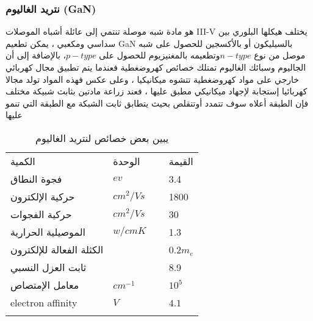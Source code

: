 \subsubsection{ نتريد الغاليوم (GaN)}
هو مادة شبه موصلة تنتمي إلى عائلة أشباه الموصلات III-V يختلف هيكلها البلوري بين سداسي ومكعبي   ، يمكن تطعيم GaN بالسيليكون أو بالأكسجين للحصول على شبه موصل من نوع $ n-type  $وتطعيمه بالمغنيزيوم للحصول على $ p-type  $، بالإضافة إلى أن الجاليوم وسبائك الغاليوم تمتلك خصائص كهروضغطية فعندما يتم تطبيق مجال كهربائي خارجي على مواد كهروضغطية تتشوه ميكانيكيا ، وعلى عكس فهذه المواد  تولد   مجالا كهربائيا إستجابة لإجهاد ميكانيكي مطبق عليها ، فعند زراعة مادتين بثابث شبيكة مختلف فإن الطبقة أعلاه سوف تتمدد أوتتقلص بحيث يتطابق ثابت الشبكة مع الطبقة  التي تنمو عليها

\begin{table}
	\centering
	\begin{tabular}{lll}
		\hline\noalign{\smallskip}
		الكمية              &  الوحدة   &~~  القيمة   \\
		\noalign{\smallskip}\hline\noalign{\smallskip}
		فجوة النطاق            &  $ ev $  &~~   3.4 \\
		حركية الإلكترون     &  $ cm^2/Vs  $   &~~ 1800    \\
		حركية الفجوات       &      $  cm^2/Vs$ &~~  30    \\
		الموصيلية الحرارية     &    $ w/cm K $    &~~   1.3\\
		الكثلة الفعالة للإلكترون  &    &~~       $ 0.2 m_e  $\\
		ثابت العزل النسبي   &    &~~  8.9\\
		معامل الإمتصاص    &  $ cm^{-1} $  &~~    $  10^5 $    \\
		electron affinity    &  $  V$  &~~    $   4.1 $    \\
		
		
		
		\noalign{\smallskip}\hline
	\end{tabular}
	\caption{     يبين بعض خصائص   لنتريد الغاليوم  }
	\label{tab:1}
	
\end{table}
\FloatBarrier
